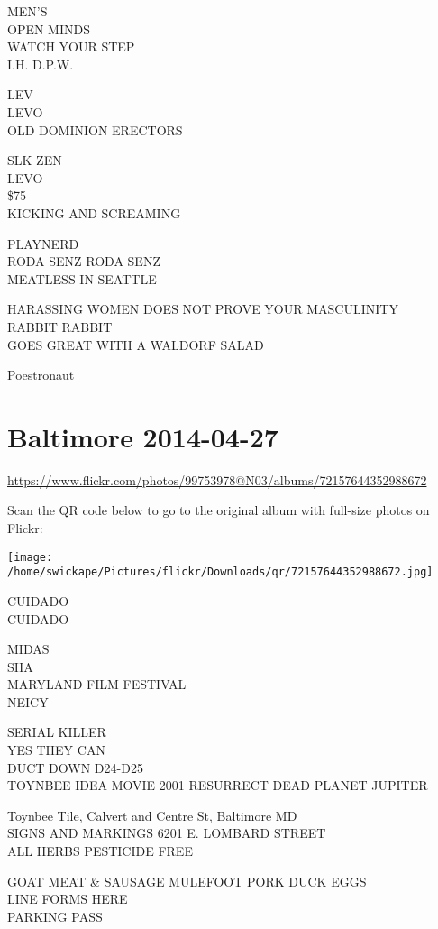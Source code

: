 \documentclass[10pt,letterpaper]{article}
\begin{document}
MEN'S\\
OPEN MINDS\\
WATCH YOUR STEP\\
I.H. D.P.W.

LEV\\
LEVO\\
OLD DOMINION ERECTORS

SLK ZEN\\
LEVO\\
\$75\\
KICKING AND SCREAMING

PLAYNERD\\
RODA SENZ RODA SENZ\\
MEATLESS IN SEATTLE

HARASSING WOMEN DOES NOT PROVE YOUR MASCULINITY\\
RABBIT RABBIT\\
GOES GREAT WITH A WALDORF SALAD

Poestronaut


\section*{Baltimore 2014-04-27}

\url{https://www.flickr.com/photos/99753978@N03/albums/72157644352988672}

Scan the QR code below to go to the original album with full-size photos on Flickr:

\texttt{[image: /home/swickape/Pictures/flickr/Downloads/qr/72157644352988672.jpg]}


CUIDADO\\
CUIDADO

MIDAS\\
SHA\\
MARYLAND FILM FESTIVAL\\
NEICY

SERIAL KILLER\\
YES THEY CAN\\
DUCT DOWN D24{-}D25\\
TOYNBEE IDEA MOVIE 2001 RESURRECT DEAD PLANET JUPITER

Toynbee Tile, Calvert and Centre St, Baltimore MD\\
SIGNS AND MARKINGS 6201 E. LOMBARD STREET\\
ALL HERBS PESTICIDE FREE

GOAT MEAT \& SAUSAGE MULEFOOT PORK DUCK EGGS\\
LINE FORMS HERE\\
PARKING PASS
\end{document}
